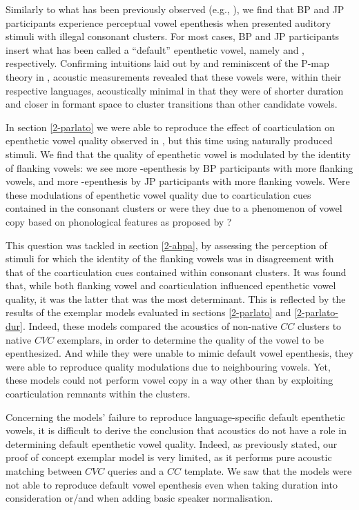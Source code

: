 Similarly to what has been previously observed (e.g., \cite{dupoux1999, dehaene2000, dupoux2011, monahan2009, mattingley2015}), we find that BP and JP participants experience perceptual vowel epenthesis when presented auditory stimuli with illegal consonant clusters. For most cases, BP and JP participants insert what has been called a ``default'' epenthetic vowel, namely  and , respectively. Confirming intuitions laid out by \cite{dupoux2011} and reminiscent of the P-map theory in \cite{steriade2001}, acoustic measurements revealed that these vowels were, within their respective languages, acoustically minimal in that they were of shorter duration and closer in formant space to cluster transitions than other candidate vowels. 

In section \ref{2-parlato} we were able to reproduce the effect of coarticulation on epenthetic vowel quality observed in \cite{dupoux2011}, but this time using naturally produced stimuli. We find that the quality of epenthetic vowel is modulated by the identity of flanking vowels: we see more -epenthesis by BP participants with more  flanking vowels, and more -epenthesis by JP participants with more  flanking vowels. Were these modulations of epenthetic vowel quality due to coarticulation cues contained in the consonant clusters or were they due to a phenomenon of vowel copy based on phonological features as proposed by \cite{rose2006, uffmann2006}? 

This question was tackled in section \ref{2-ahpa}, by assessing the perception of stimuli for which the identity of the flanking vowels was in disagreement with that of the coarticulation cues contained within consonant clusters. It was found that, while both flanking vowel and coarticulation influenced epenthetic vowel quality, it was the latter that was the most determinant. This is reflected by the results of the exemplar models evaluated in sections \ref{2-parlato} and \ref{2-parlato-dur}. Indeed, these models compared the acoustics of non-native $CC$ clusters to native $CVC$ exemplars, in order to determine the quality of the vowel to be epenthesized. And while they were unable to mimic default vowel epenthesis, they were able to reproduce quality modulations due to neighbouring vowels. Yet, these models could not perform vowel copy in a way other than by exploiting coarticulation remnants within the clusters.              

Concerning the models' failure to reproduce language-specific default epenthetic vowels, it is difficult to derive the conclusion that acoustics do not have a role in determining default epenthetic vowel quality. Indeed, as previously stated, our proof of concept exemplar model is very limited, as it performs pure acoustic matching between $CVC$ queries and a $CC$ template. We saw that the models were not able to reproduce default vowel epenthesis even when taking duration into consideration or/and when adding basic speaker normalisation. \\

